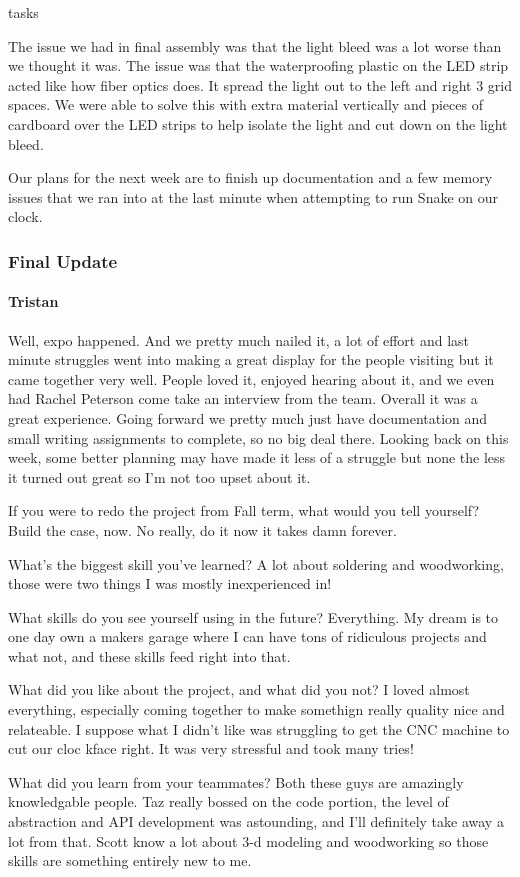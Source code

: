 tasks\documentclass[onecolumn, draftclsnofoot,10pt, compsoc]{IEEEtran}
\begin{document}
The issue we had in final assembly was that the light bleed was a lot worse than we thought it was. The issue was that the waterproofing plastic on the LED strip acted like how fiber optics does. It spread the light out to the left and right 3 grid spaces. We were able to solve this with extra material vertically and pieces of cardboard over the LED strips to help isolate the light and cut down on the light bleed.

Our plans for the next week are to finish up documentation and a few memory issues that we ran into at the last minute when attempting to run Snake on our clock.
\subsubsection{Final Update}
\paragraph{Tristan}
Well, expo happened. And we pretty much nailed it, a lot of effort and last minute struggles went into making a great display for the people visiting but it came together very well. People loved it, enjoyed hearing about it, and we even had Rachel Peterson come take an interview from the team. Overall it was a great experience. Going forward we pretty much just have documentation and small writing assignments to complete, so no big deal there. Looking back on this week, some better planning may have made it less of a struggle but none the less it turned out great so I'm not too upset about it.

If you were to redo the project from Fall term, what would you tell yourself? Build the case, now. No really, do it now it takes damn forever.

What's the biggest skill you've learned? A lot about soldering and woodworking, those were two things I was mostly inexperienced in!

What skills do you see yourself using in the future? Everything. My dream is to one day own a makers garage where I can have tons of ridiculous projects and what not, and these skills feed right into that.

What did you like about the project, and what did you not? I loved almost everything, especially coming together to make somethign really quality nice and relateable. I suppose what I didn't like was struggling to get the CNC machine to cut our cloc kface right. It was very stressful and took many tries!

What did you learn from your teammates? Both these guys are amazingly knowledgable people. Taz really bossed on the code portion, the level of abstraction and API development was astounding, and I'll definitely take away a lot from that. Scott know a lot about 3-d modeling and woodworking so those skills are something entirely new to me.
\end{document}
